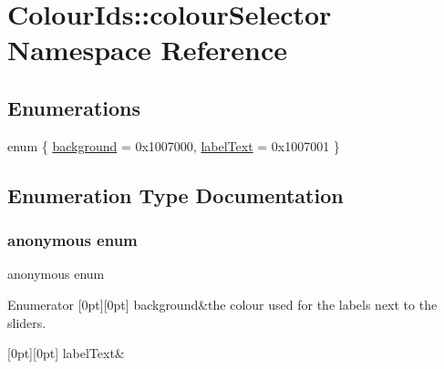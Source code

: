 \hypertarget{namespaceColourIds_1_1colourSelector}{}\section{Colour\+Ids\+:\+:colour\+Selector Namespace Reference}
\label{namespaceColourIds_1_1colourSelector}
\subsection*{Enumerations}
\begin{DoxyCompactItemize}
\item 
enum \{ \mbox{\hyperlink{namespaceColourIds_1_1colourSelector_a4ca64bc41549e4e61571b05b2d9395acaf07bdb6b1c01e727028c4a910da9f540}{background}} = 0x1007000, 
\mbox{\hyperlink{namespaceColourIds_1_1colourSelector_a4ca64bc41549e4e61571b05b2d9395acace6bc826a35590e88c1768531126cf12}{label\+Text}} = 0x1007001
 \}
\end{DoxyCompactItemize}


\subsection{Enumeration Type Documentation}
\mbox{\label{namespaceColourIds_1_1colourSelector_a4ca64bc41549e4e61571b05b2d9395ac}} 
\subsubsection{\texorpdfstring{anonymous enum}{anonymous enum}}
{\footnotesize\ttfamily anonymous enum}

\begin{DoxyEnumFields}{Enumerator}
[0pt][0pt]{}\mbox{\label{namespaceColourIds_1_1colourSelector_a4ca64bc41549e4e61571b05b2d9395acaf07bdb6b1c01e727028c4a910da9f540}} 
background&the colour used for the labels next to the sliders. \\
\hline

[0pt][0pt]{}\mbox{\label{namespaceColourIds_1_1colourSelector_a4ca64bc41549e4e61571b05b2d9395acace6bc826a35590e88c1768531126cf12}} 
label\+Text&\\
\hline

\end{DoxyEnumFields}
